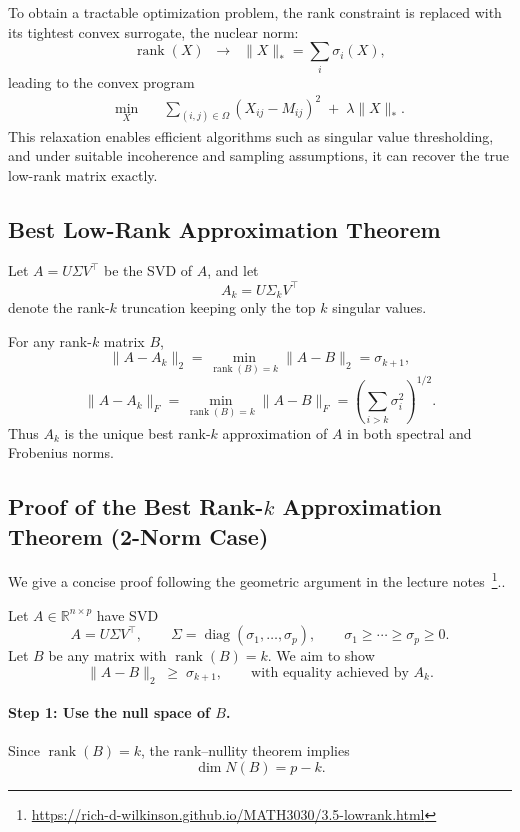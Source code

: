 \documentclass{article}
\begin{document}
To obtain a tractable optimization problem, the rank constraint is replaced with its tightest convex surrogate, the nuclear norm:
\[
\operatorname{rank}(X) 
\;\;\longrightarrow\;\; \|X\|_* = \sum_i \sigma_i(X),
\]
leading to the convex program
\[
\begin{aligned}
\min_{X} \quad &
\sum_{(i,j)\in\Omega} (X_{ij} - M_{ij})^2
\;+\; \lambda \|X\|_* .
\end{aligned}
\]
This relaxation enables efficient algorithms such as singular value thresholding, and under suitable incoherence and sampling assumptions, it can recover the true low-rank matrix exactly.



\subsection{Best Low-Rank Approximation Theorem}

Let $A=U\Sigma V^\top$ be the SVD of $A$, and let
\[
A_k = U \Sigma_k V^\top
\]
denote the rank-$k$ truncation keeping only the top $k$ singular values.

\begin{theorem}
For any rank-$k$ matrix $B$,
\[
\|A - A_k\|_2 = \min_{\operatorname{rank}(B)=k} \|A - B\|_2 = \sigma_{k+1},
\]
\[
\|A - A_k\|_F = \min_{\operatorname{rank}(B)=k} \|A - B\|_F
 = \left( \sum_{i>k} \sigma_i^2 \right)^{1/2}.
\]
Thus $A_k$ is the unique best rank-$k$ approximation of $A$ in both spectral and Frobenius norms.
\end{theorem}

\subsection{Proof of the Best Rank-$k$ Approximation Theorem (2-Norm Case)}

We give a concise proof following the geometric argument in the lecture notes~\footnote{\url{https://rich-d-wilkinson.github.io/MATH3030/3.5-lowrank.html}}..

Let $A \in \mathbb{R}^{n \times p}$ have SVD
\[
A = U \Sigma V^\top,
\qquad
\Sigma = \operatorname{diag}(\sigma_1,\dots,\sigma_p),
\qquad
\sigma_1 \ge \cdots \ge \sigma_p \ge 0.
\]
Let $B$ be any matrix with $\operatorname{rank}(B)=k$.  
We aim to show
\[
\|A - B\|_2 \;\ge\; \sigma_{k+1},
\qquad\text{with equality achieved by } A_k.
\]

\paragraph{Step 1: Use the null space of $B$.}
Since $\operatorname{rank}(B) = k$, the rank–nullity theorem implies
\[
\dim N(B) = p - k.
\]
\end{document}
